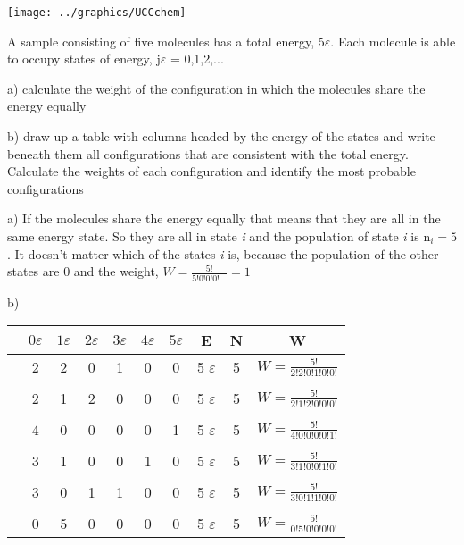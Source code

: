 \documentclass[addpoints,12pt]{exam}
\begin{document}
\begin{center}
\texttt{[image: ../graphics/UCCchem]}

\end{center}
\vspace{0.1in}

\begin{questions}
\question A sample consisting of five molecules has a total energy, 5\(\varepsilon\). Each molecule is able to occupy states of energy, j\(\varepsilon\) = 0,1,2,...

a) calculate the weight of the configuration in which the molecules share the energy equally

b) draw up a table with columns headed by the energy of the states and write beneath them all configurations that are consistent with the total energy.  Calculate the weights of each configuration and identify the most probable configurations

\begin{solution} a) If the molecules share the energy equally that means that they are all in the same energy state. So they are all in state \textit{i} and the population of state \textit{i} is n\(_i = 5\). It doesn't matter which of the states \textit{i} is, because the population of the other states are 0 and the weight, \(W = \frac{5!}{5!0!0!0!...} = 1\)

b) 

\begin{tabular}{lccccccccc}
 & \(0\varepsilon\) & \(1\varepsilon\) & \(2\varepsilon\) & \(3\varepsilon\) & \(4\varepsilon\) & \(5\varepsilon\) & E & N & W\\\hline
  & 2 & 2 & 0 & 1 & 0 & 0 & 5 \(\varepsilon\) & 5 & \(W=\frac{5!}{2!2!0!1!0!0!}\)\\\\[-1em]
  & 2 & 1 & 2 & 0 & 0 & 0 & 5 \(\varepsilon\) & 5 & \(W=\frac{5!}{2!1!2!0!0!0!}\)\\\\[-1em]
 & 4 & 0 & 0 & 0 & 0 & 1 & 5 \(\varepsilon\) & 5 & \(W=\frac{5!}{4!0!0!0!0!1!}\)\\\\[-1em]
 & 3 & 1 & 0 & 0 & 1 & 0 & 5 \(\varepsilon\) & 5 & \(W=\frac{5!}{3!1!0!0!1!0!}\)\\\\[-1em]
 & 3 & 0 & 1 & 1 & 0 & 0 & 5 \(\varepsilon\) & 5 & \(W=\frac{5!}{3!0!1!1!0!0!}\)\\\\[-1em]
 & 0 & 5 & 0 & 0 & 0 & 0 & 5 \(\varepsilon\) & 5 & \(W=\frac{5!}{0!5!0!0!0!0!}\)\\\hline
\end{tabular}


\end{solution}
\end{questions}
\end{document}
